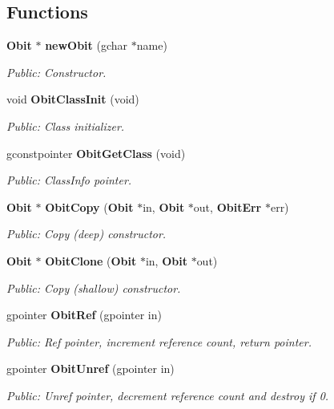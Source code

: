 \subsection*{Functions}
\begin{CompactItemize}
\item 
{\bf Obit} $\ast$ {\bf new\-Obit} (gchar $\ast$name)
\begin{CompactList}\small\item\em Public: Constructor. \item\end{CompactList}\item 
void {\bf Obit\-Class\-Init} (void)
\begin{CompactList}\small\item\em Public: Class initializer. \item\end{CompactList}\item 
gconstpointer {\bf Obit\-Get\-Class} (void)
\begin{CompactList}\small\item\em Public: Class\-Info pointer. \item\end{CompactList}\item 
{\bf Obit} $\ast$ {\bf Obit\-Copy} ({\bf Obit} $\ast$in, {\bf Obit} $\ast$out, {\bf Obit\-Err} $\ast$err)
\begin{CompactList}\small\item\em Public: Copy (deep) constructor. \item\end{CompactList}\item 
{\bf Obit} $\ast$ {\bf Obit\-Clone} ({\bf Obit} $\ast$in, {\bf Obit} $\ast$out)
\begin{CompactList}\small\item\em Public: Copy (shallow) constructor. \item\end{CompactList}\item 
gpointer {\bf Obit\-Ref} (gpointer in)
\begin{CompactList}\small\item\em Public: Ref pointer, increment reference count, return pointer. \item\end{CompactList}\item 
gpointer {\bf Obit\-Unref} (gpointer in)
\begin{CompactList}\small\item\em Public: Unref pointer, decrement reference count and destroy if 0. \item\end{CompactList}\item 

\end{CompactItemize}
